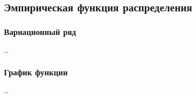 \subsection{Эмпирическая функция распределения}

\subsubsection{Вариационный ряд}

\dots

\subsubsection{График функции}

\dots